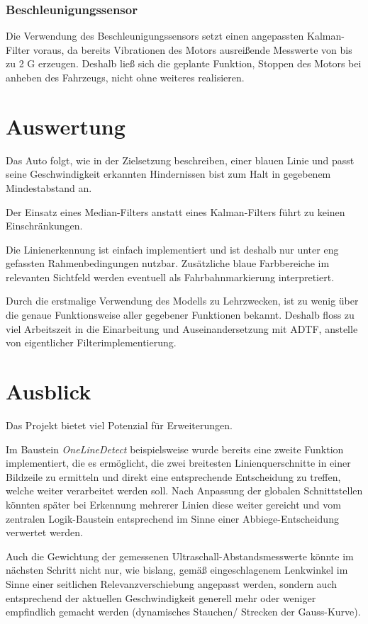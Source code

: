 \documentclass[12pt, a4paper]{scrartcl}
\begin{document}
\subsubsection{Beschleunigungssensor}
Die Verwendung des Beschleunigungssensors setzt einen angepassten Kalman-Filter voraus, da bereits Vibrationen des Motors ausreißende Messwerte von bis zu 2 G erzeugen. Deshalb ließ sich die geplante Funktion, Stoppen des Motors bei anheben des Fahrzeugs, nicht ohne weiteres realisieren. 

\newpage
\section{Auswertung}
Das Auto folgt, wie in der Zielsetzung beschreiben, einer blauen Linie und passt seine Geschwindigkeit erkannten Hindernissen bist zum Halt in gegebenem Mindestabstand an.

Der Einsatz eines Median-Filters anstatt eines Kalman-Filters führt zu keinen Einschränkungen.

Die Linienerkennung ist einfach implementiert und ist deshalb nur unter eng gefassten Rahmenbedingungen nutzbar. Zusätzliche blaue Farbbereiche im relevanten Sichtfeld werden eventuell als Fahrbahnmarkierung interpretiert.

Durch die erstmalige Verwendung des Modells zu Lehrzwecken, ist zu wenig über die genaue Funktionsweise aller gegebener Funktionen bekannt. Deshalb floss zu viel Arbeitszeit in die Einarbeitung und Auseinandersetzung mit ADTF, anstelle von eigentlicher Filterimplementierung.

\section{Ausblick}
Das Projekt bietet viel Potenzial für Erweiterungen.

Im Baustein \emph{OneLineDetect} beispielsweise wurde bereits eine zweite Funktion implementiert, die es ermöglicht, die zwei breitesten Linienquerschnitte in einer Bildzeile zu ermitteln und direkt eine entsprechende Entscheidung zu treffen, welche weiter verarbeitet werden soll. Nach Anpassung der globalen Schnittstellen könnten später bei Erkennung mehrerer Linien diese weiter gereicht und vom zentralen Logik-Baustein entsprechend im Sinne einer Abbiege-Entscheidung verwertet werden.

Auch die Gewichtung der gemessenen Ultraschall-Abstandsmesswerte könnte im nächsten Schritt nicht nur, wie bislang, gemäß eingeschlagenem Lenkwinkel im Sinne einer seitlichen Relevanzverschiebung angepasst werden, sondern auch entsprechend der aktuellen Geschwindigkeit generell mehr oder weniger empfindlich gemacht werden (dynamisches Stauchen/ Strecken der Gauss-Kurve).
\end{document}
